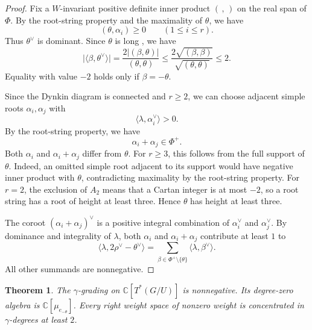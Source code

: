 \documentclass[12pt]{article}
\theoremstyle{paperplain}
\newtheorem{theorem}{Theorem}[section]
\theoremstyle{paperdefinition}
\newcommand{\C}{\mathbb C}
\begin{document}
\begin{proof}
    Fix a $W$-invariant positive definite inner product $(\, ,\, )$ on the real span of $\Phi$. By the root-string property and the maximality of $\theta$, we have
    $$
        (\theta,\alpha_i)\ge0\qquad(1\le i\le r).
    $$
    Thus $\theta^\vee$ is dominant. Since $\theta$ is long \cite[Chapter~VI, Section~1]{Bourbaki}, we have
    $$
        \bigl|\langle\beta,\theta^\vee\rangle\bigr|
        =\frac{2|(\beta,\theta)|}{(\theta,\theta)}
        \le\frac{2\sqrt{(\beta,\beta)}}{\sqrt{(\theta,\theta)}}\le2.
    $$
    Equality with value $-2$ holds only if $\beta=-\theta$.

    Since the Dynkin diagram is connected and $r\ge2$, we can choose adjacent simple roots $\alpha_i,\alpha_j$ with
    $$
        \langle\lambda,\alpha_i^\vee\rangle>0.
    $$
    By the root-string property, we have
    $$
        \alpha_i+\alpha_j\in\Phi^+.
    $$
    Both $\alpha_i$ and $\alpha_i+\alpha_j$ differ from $\theta$. For $r\ge3$, this follows from the full support of $\theta$. Indeed, an omitted simple root adjacent to its support would have negative inner product with $\theta$, contradicting maximality by the root-string property. For $r=2$, the exclusion of $A_2$ means that a Cartan integer is at most $-2$, so a root string has a root of height at least three. Hence $\theta$ has height at least three.

    The coroot $(\alpha_i+\alpha_j)^\vee$ is a positive integral combination of $\alpha_i^\vee$ and $\alpha_j^\vee$. By dominance and integrality of $\lambda$, both $\alpha_i$ and $\alpha_i+\alpha_j$ contribute at least $1$ to
    $$
        \langle\lambda,2\rho^\vee-\theta^\vee\rangle
        =\sum_{\beta\in\Phi^+\setminus\{\theta\}}
        \langle\lambda,\beta^\vee\rangle.
    $$
    All other summands are nonnegative.
\end{proof}

\setlength{\abovedisplayskip}{12pt plus 2pt minus 2pt}
\setlength{\belowdisplayskip}{12pt plus 2pt minus 2pt}
\setlength{\abovedisplayshortskip}{0pt plus 2pt}
\setlength{\belowdisplayshortskip}{10pt plus 2pt minus 2pt}
\begin{theorem}\label{thm:gamma-grading}
    The $\gamma$-grading on $\C[T^*(G/U)]$ is nonnegative. Its degree-zero algebra is $\C[\mu_{e_{-\theta}}]$. Every right weight space of nonzero weight is concentrated in $\gamma$-degrees at least $2$.
\end{theorem}
\end{document}
